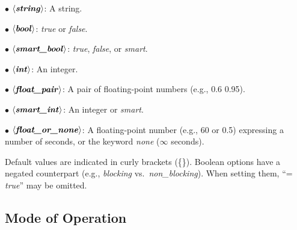 \documentclass[a4paper,12pt]{article}
\def\qtybf#1{$\mathbf{\left<\textbf{\textit{#1\/}}\right>}$}
\begin{document}
\begin{enum}
\item[$\bullet$] \qtybf{string}: A string.
\item[$\bullet$] \qtybf{bool\/}: \textit{true} or \textit{false}.
\item[$\bullet$] \qtybf{smart\_bool\/}: \textit{true}, \textit{false}, or
\textit{smart}.
\item[$\bullet$] \qtybf{int\/}: An integer.
\item[$\bullet$] \qtybf{float\_pair\/}: A pair of floating-point numbers
(e.g., 0.6 0.95).
\item[$\bullet$] \qtybf{smart\_int\/}: An integer or \textit{smart}.
\item[$\bullet$] \qtybf{float\_or\_none\/}: A floating-point number (e.g., 60 or
0.5) expressing a number of seconds, or the keyword \textit{none} ($\infty$
seconds).
\end{enum}

Default values are indicated in curly brackets (\textrm{\{\}}). Boolean options
have a negated counterpart (e.g., \textit{blocking} vs.\
\textit{non\_blocking}). When setting them, ``= \textit{true}'' may be omitted.

\subsection{Mode of Operation}
\label{mode-of-operation}
\end{document}
